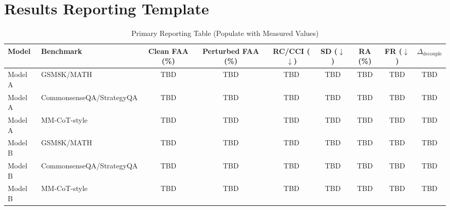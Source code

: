 \documentclass[conference]{IEEEtran}
\begin{document}
\section{Results Reporting Template}
\begin{table}[!t]
\caption{Primary Reporting Table (Populate with Measured Values)}
\label{tab:main-results}
\centering
\begin{tabular}{l l c c c c c c c}
\toprule
Model & Benchmark & Clean FAA (\%) & Perturbed FAA (\%) & RC/CCI ($\downarrow$) & SD ($\downarrow$) & RA (\%) & FR ($\downarrow$) & $\Delta_{\mathrm{decouple}}$ \\
\midrule
Model A & GSM8K/MATH & TBD & TBD & TBD & TBD & TBD & TBD & TBD \\
Model A & CommonsenseQA/StrategyQA & TBD & TBD & TBD & TBD & TBD & TBD & TBD \\
Model A & MM-CoT-style & TBD & TBD & TBD & TBD & TBD & TBD & TBD \\
\midrule
Model B & GSM8K/MATH & TBD & TBD & TBD & TBD & TBD & TBD & TBD \\
Model B & CommonsenseQA/StrategyQA & TBD & TBD & TBD & TBD & TBD & TBD & TBD \\
Model B & MM-CoT-style & TBD & TBD & TBD & TBD & TBD & TBD & TBD \\
\bottomrule
\end{tabular}
\end{table}

\begin{table}[!t]
\caption{Perturbation-Class Ablation Template}
\label{tab:ablation}
\centering
{}
\end{table}

\begin{table}[!t]
\caption{Perturbation Position Effect Template (for H3)}
\label{tab:position-effect}
\centering
{}
\end{table}
\end{document}
